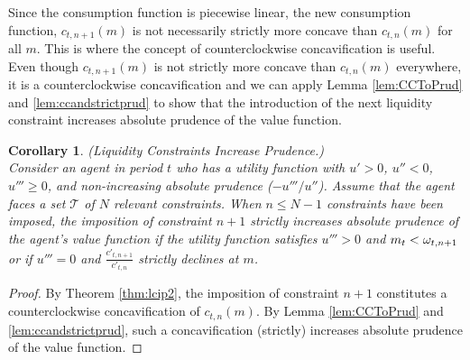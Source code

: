 \documentclass[titlepage]{\econtex}
\newcommand{\ifVerbatimWrite}{\ifthenelse{\boolean{verbatimwriteOn}}} %
\renewenvironment{verbatimwrite}[1]{} %
\providecommand{\wAlt}{\omega}
\newtheorem{corollary}{Corollary}
\begin{document}
\begin{verbatimwrite}{Sections/LCandCC}
    Since the consumption function is piecewise linear, the new consumption function, $c_{t,n+1}({m})$ is not necessarily strictly more concave than $c_{t,n}({m})$ for all ${m}$. This is where the concept of counterclockwise concavification is useful. Even though $c_{t,n+1}({m})$ is not strictly more concave than $c_{t,n}({m})$ everywhere, it is a counterclockwise concavification and we can apply Lemma \ref{lem:CCToPrud} and \ref{lem:ccandstrictprud} to show that the introduction of the next liquidity constraint increases absolute prudence of the value function. 
    \begin{corollary}\label{cor:lcip} (Liquidity Constraints Increase Prudence.) \\
      Consider an agent in period $t$ who has a utility function with $u' > 0$, $u'' < 0$, $u''' \geq 0$, and non-increasing absolute prudence ($-u'''/u''$). Assume that the agent faces a set $\mathcal{T}$ of $N$ relevant constraints. When $n \leq N-1$ constraints have been imposed, the imposition of constraint $n+1$ strictly increases absolute prudence of the agent's value function if the utility function satisfies $u''' > 0$ and ${m}_{t} < \wAlt_{t,n+1}$ or if $u''' = 0$ and $\frac{c'_{t,n+1}}{c'_{t,n}}$ strictly declines at ${m}$.
    \end{corollary}
    \begin{proof}
      By Theorem \ref{thm:lcip2}, the imposition of constraint $n+1$ constitutes a counterclockwise concavification of $c_{t,n}({m})$. By Lemma \ref{lem:CCToPrud} and \ref{lem:ccandstrictprud}, such a concavification (strictly) increases absolute prudence of the value function.
    \end{proof}
    \noindent %
    \newpage
  \end{verbatimwrite}\ifVerbatimWrite{}{} %
\end{document}
